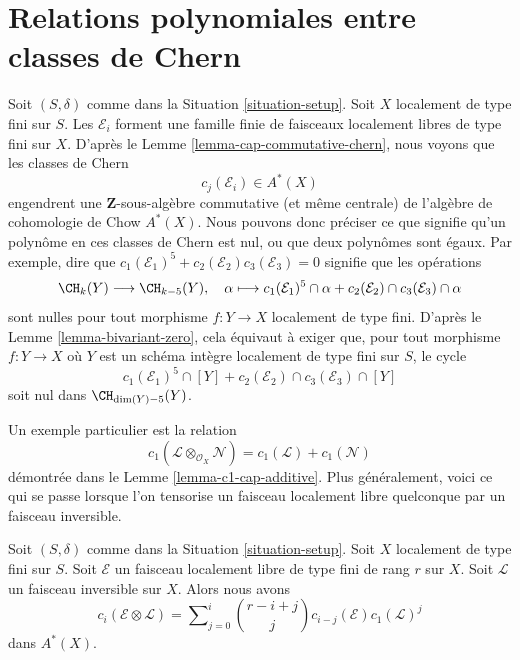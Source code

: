 \section{Relations polynomiales entre classes de Chern}
\label{section-relations-chern-classes}

\noindent
Soit $(S, \delta)$ comme dans la Situation \ref{situation-setup}. Soit $X$ localement
de type fini sur $S$. Les $\mathcal{E}_i$ forment une famille finie de faisceaux
localement libres de type fini sur $X$. D'après le Lemme \ref{lemma-cap-commutative-chern},
nous voyons que les classes de Chern
$$
c_j(\mathcal{E}_i) \in A^*(X)
$$
engendrent une $\mathbf{Z}$-sous-algèbre commutative (et même centrale) de
l'algèbre de cohomologie de Chow $A^*(X)$.
Nous pouvons donc préciser ce que signifie qu'un polynôme en ces classes de Chern
est nul, ou que deux polynômes sont égaux. Par exemple, dire que
$c_1(\mathcal{E}_1)^5 + c_2(\mathcal{E}_2)c_3(\mathcal{E}_3) = 0$
signifie que les opérations
$$
\CH_k(Y) \longrightarrow \CH_{k - 5}(Y), \quad
\alpha \longmapsto
c_1(\mathcal{E}_1)^5 \cap \alpha +
c_2(\mathcal{E}_2) \cap c_3(\mathcal{E}_3) \cap \alpha
$$
sont nulles pour tout morphisme $f : Y \to X$ localement de type fini.
D'après le Lemme \ref{lemma-bivariant-zero},
cela équivaut à exiger que, pour tout morphisme
$f : Y \to X$  où $Y$ est un schéma intègre
localement de type fini sur $S$, le cycle
$$
c_1(\mathcal{E}_1)^5 \cap [Y] +
c_2(\mathcal{E}_2) \cap c_3(\mathcal{E}_3) \cap [Y]
$$
soit nul dans $\CH_{\dim(Y) - 5}(Y)$.

\medskip\noindent
Un exemple particulier est la relation
$$
c_1(\mathcal{L} \otimes_{\mathcal{O}_X} \mathcal{N})
=
c_1(\mathcal{L}) + c_1(\mathcal{N})
$$
démontrée dans le Lemme \ref{lemma-c1-cap-additive}.
Plus généralement, voici ce qui se passe lorsque l'on tensorise un
faisceau localement libre quelconque par un faisceau inversible.

\begin{lemma}
\label{lemma-chern-classes-E-tensor-L}
Soit $(S, \delta)$ comme dans la Situation \ref{situation-setup}.
Soit $X$ localement de type fini sur $S$.
Soit $\mathcal{E}$ un faisceau localement libre de type fini de
rang $r$ sur $X$. Soit $\mathcal{L}$ un faisceau inversible
sur $X$. Alors nous avons
\begin{equation}
\label{equation-twist}
c_i({\mathcal E} \otimes {\mathcal L})
=
\sum\nolimits_{j = 0}^i
\binom{r - i + j}{j} c_{i - j}({\mathcal E}) c_1({\mathcal L})^j
\end{equation}
dans $A^*(X)$.
\end{lemma}

